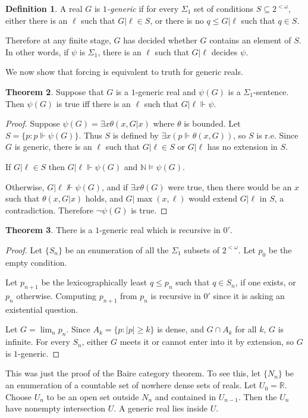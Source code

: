 \documentclass[12pt]{report}
\newcommand{\NN}{\mathbb{N}}
\newcommand{\RR}{\mathbb{R}}
\newcommand{\forces}{\Vdash}
\newcommand{\dfn}[1]{\emph{#1}\index{#1}}
\theoremstyle{definition}
\newtheorem{theorem}{Theorem}[chapter]
\newtheorem{definition}[theorem]{Definition}
\begin{document}
\begin{definition}
A real $G$ is \dfn{$1$-generic} if for every $\Sigma_1$ set of conditions $S \subseteq 2^{<\omega}$, either there is an $\ell$ such that $G|\ell \in S$, or there is no $q \leq G|\ell$ such that $q \in S$.
\end{definition}
Therefore at any finite stage, $G$ has decided whether $G$ contains an element of $S$. In other words, if $\psi$ is $\Sigma_1$, there is an $\ell$ such that $G|\ell$ decides $\psi$.

We now show that forcing is equivalent to truth for generic reals.
\begin{theorem}
Suppose that $G$ is a $1$-generic real and $\psi(G)$ is a $\Sigma_1$-sentence. Then $\psi(G)$ is true iff there is an $\ell$ such that $G|\ell \forces \psi$.
\end{theorem}
\begin{proof}
Suppose $\psi(G) = \exists x \theta(x, G|x)$ where $\theta$ is bounded. Let $S = \{p: p \forces \psi(G)\}$. Thus $S$ is defined by $\exists x(p\forces \theta(x, G))$, so $S$ is r.e.
Since $G$ is generic, there is an $\ell$ such that $G|\ell \in S$ or $G|\ell$ has no extension in $S$.

If $G|\ell \in S$ then $G|\ell \forces \psi(G)$ and $\NN \models \psi(G)$.

Otherwise, $G|\ell \not \forces \psi(G)$, and if $\exists x\theta(G)$ were true, then there would be an $x$ such that $\theta(x, G|x)$ holds, and $G|\max(x,\ell)$ would extend $G|\ell$ in $S$, a contradiction. Therefore $\neg \psi(G)$ is true.
\end{proof}

\begin{theorem}
There is a $1$-generic real which is recursive in $0'$.
\end{theorem}
\begin{proof}
Let $\{S_n\}$ be an enumeration of all the $\Sigma_1$ subsets of $2^{<\omega}$. Let $p_0$ be the empty condition.

Let $p_{n+1}$ be the lexicographically least $q \leq p_n$ such that $q \in S_n$, if one exists, or $p_n$ otherwise. Computing $p_{n+1}$ from $p_n$ is recursive in $0'$ since it is asking an existential question.

Let $G = \lim_n p_n$. Since $A_k = \{p: |p| \geq k\}$ is dense, and $G \cap A_k$ for all $k$, $G$ is infinite. For every $S_n$, either $G$ meets it or cannot enter into it by extension, so $G$ is $1$-generic.
\end{proof}
This was just the proof of the Baire category theorem.
To see this, let $\{N_n\}$ be an enumeration of a countable set of nowhere dense sets of reals. Let $U_0 = \RR$. Choose $U_n$ to be an open set outside $N_n$ and contained in $U_{n-1}$. Then the $U_n$ have nonempty intersection $U$.
A generic real lies inside $U$.
\end{document}
